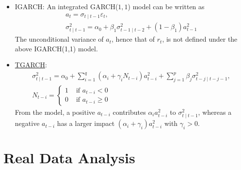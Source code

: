 \documentclass{beamer}
\begin{document}
  \begin{frame}
    \begin{itemize}
      \item IGARCH: An integrated GARCH($1,1$) model can be written as 
      \begin{displaymath}
        \begin{array}{c} %
          a_{t}=\sigma_{t \mid t-1} \varepsilon_{t}, \\
          \sigma_{t \mid t-1}^{2}=\alpha_{0}+\beta_{1}\sigma_{t-1 \mid t-2}^2+(1-\beta_{1})a_{t-1}^{2}
        \end{array}
      \end{displaymath}
      The unconditional variance of $a_{t}$, hence that of $r_{t}$, is not defined under the above IGARCH(1,1) model.
      \item \hyperlink{TGARCH back}{\hypertarget{TGARCH}{TGARCH}}: 
        \begin{displaymath}
          \begin{array}{c}
            \sigma_{t \mid t-1}^{2}=\alpha_{0}+\sum_{i=1}^{q}\left(\alpha_{i}+\gamma_{i} N_{t-i}\right) a_{t-i}^{2}+\sum_{j=1}^{p} \beta_{j} \sigma_{t-j \mid t-j-1}^{2},\\
            N_{t-i}=\left\{\begin{array}{ll}
              1 & \text { if } a_{t-i}<0 \\
              0 & \text { if } a_{t-i} \geq 0
              \end{array}\right.
          \end{array}
        \end{displaymath}
        From the model, a positive $a_{t-i}$ contributes $\alpha_{i}a_{t-i}^2$ to $\sigma_{t \mid t-1}^2$, whereas a negative $a_{t-i}$ has a larger impact $(\alpha_{i}+\gamma_{i})a_{t-i}^2$ with $\gamma_{i}>0$.
    \end{itemize}
\end{frame}


\section{Real Data Analysis}
\end{document}
